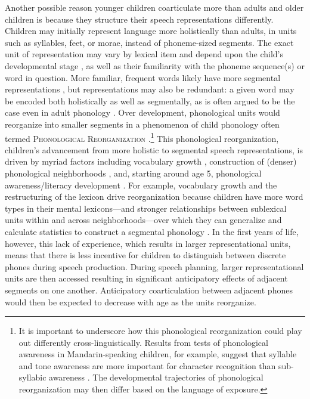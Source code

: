 \documentclass[a4paper,man,natbib,donotrepeattitle, apacite]{apa6}
\begin{document}
Another possible reason younger children coarticulate more than adults and older children is because they structure their speech representations differently. Children may initially represent language more holistically than adults, in units such as syllables, feet, or morae, instead of phoneme-sized segments. The exact unit of representation may vary by lexical item and depend upon the child's developmental stage \cite{davisEmergenceDiscretePerceptualMotor2019}, as well as their familiarity with the phoneme sequence(s) or word in question. More familiar, frequent words likely have more segmental representations \cite{edwardsInteractionVocabularySize2004}, but representations may also be redundant: a given word may be encoded both holistically as well as segmentally, as is often argued to be the case even in adult phonology \cite{pierrehumbertPhoneticDiversityStatistical2003}. Over development, phonological units would reorganize into smaller segments in a phenomenon of child phonology often termed \textsc{Phonological Reorganization}  \cite{goodellAcousticEvidenceDevelopment1992,metsalaYoungChildrenPhonological1999,metsalaYoungChildrenPhonological1999,nittrouerEmergencePhoneticSegments1989,nittrouerHowChildrenLearn1996,noiraySpokenLanguageDevelopment2019,noirayHowChildrenOrganize2018,redfordGrammaticalWordProduction2018,zharkovaCoarticulationIndicatorSpeech2011}.\footnote{It is important to underscore how this phonological reorganization could play out differently cross-linguistically. Results from tests of phonological awareness in Mandarin-speaking children, for example, suggest that syllable and tone awareness are more important for character recognition than sub-syllabic awareness \cite{mcbride-changLevelsPhonologicalAwareness2004,shuPhonologicalAwarenessYoung2008a}. The developmental trajectories of phonological reorganization may then differ based on the language of exposure.} This phonological reorganization, children's advancement from more holistic to segmental speech representations, is driven by myriad factors including vocabulary growth \cite{metsalaSpokenVocabularyGrowth1998}, construction of (denser) phonological neighborhoods \cite{storkelInfluencePartwordPhonotactic2011}, and, starting around age 5, phonological awareness/literacy development \cite{metsalaYoungChildrenPhonological1999}. For example, vocabulary growth and the restructuring of the lexicon drive reorganization because children have more word types in their mental lexicons---and stronger relationships between sublexical units within and across neighborhoods---over which they can generalize and calculate statistics to construct a segmental phonology \cite{storkelRestructuringSimilarityNeighbourhoods2002}. In the first years of life, however, this lack of experience, which results in larger representational units, means that there is less incentive for children to distinguish between discrete phones during speech production. During speech planning, larger representational units are then accessed resulting in significant anticipatory effects of adjacent segments on one another. Anticipatory coarticulation between adjacent phones would then be expected to decrease with age as the units reorganize.
\end{document}
